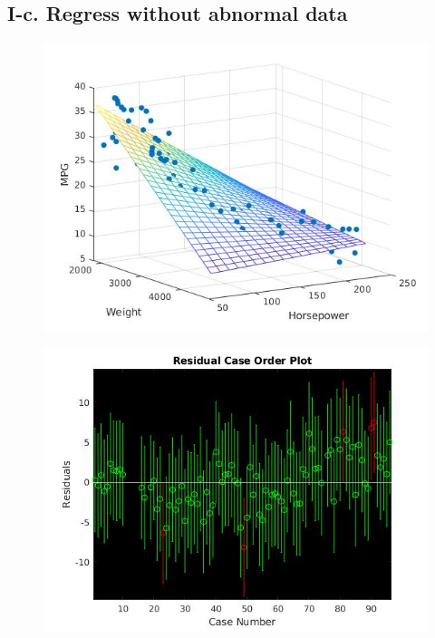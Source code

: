 \documentclass[twoside,a4paper]{article}
\begin{document}
\subsection*{I-c. Regress without abnormal data}
\begin{figure}[H]
\centering
\includegraphics[width=6in]{newregress.jpg}
\end{figure}

\begin{figure}[H]
\centering
\includegraphics[width=6in]{resnew.jpg}
\end{figure}
\end{document}

